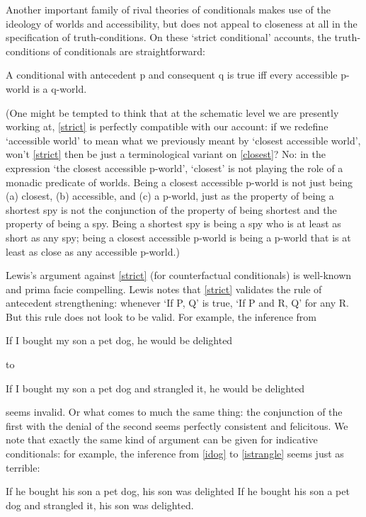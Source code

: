 \documentclass[leqno, 11pt, a5paper, openany]{article}
\begin{document}
Another important family of rival theories of conditionals makes use of the ideology of worlds and accessibility, but does not appeal to closeness at all in the specification of truth-conditions. On these ‘strict conditional’ accounts, the truth-conditions of conditionals are straightforward:
\begin{prop}
\litem[STRICT] \label{strict}
	A conditional with antecedent p and consequent q is true iff every accessible p-world is a q-world.
\end{prop}
(One might be tempted to think that at the schematic level we are
presently working at, \ref{strict} is perfectly compatible with our account:
if we redefine ‘accessible world’ to mean what we previously meant by
‘closest accessible world’, won't \ref{strict} then be just a terminological
variant on \ref{closest}? No: in the expression ‘the closest accessible
p-world’, ‘closest’ is not playing the role of a monadic predicate of
worlds. Being a closest accessible p-world is not just being (a)
closest, (b) accessible, and (c) a p-world, just as the property of
being a shortest spy is not the conjunction of the property of being
shortest and the property of being a spy. Being a shortest spy is being
a spy who is at least as short as any spy; being a closest accessible
p-world is being a p-world that is at least as close as any accessible
p-world.)

Lewis's argument against \ref{strict} (for counterfactual conditionals) is
well-known and prima facie compelling. Lewis notes that \ref{strict} validates
the rule of antecedent strengthening: whenever ‘If P, Q’ is true, ‘If P
and R, Q’ for any R. But this rule does not look to be valid. For example, the inference
from
\begin{prop}
	\nitem \label{dog}
	If I bought my son a pet dog, he would be delighted
\end{prop}
to
\begin{prop}
	\nitem \label{strangle}
	If I bought my son a pet dog and strangled it, he would be delighted
\end{prop}
seems invalid. Or what comes to much the same thing: the conjunction of the first with the denial of the second seems perfectly consistent and felicitous. We note that exactly the same kind of argument can be given for indicative conditionals: for example, the inference from \ref{idog} to \ref{istrangle} seems just as terrible:
\begin{prop}
	\nitem \label{idog}
	If he bought his son a pet dog, his son was delighted
	\nitem \label{istrangle}
	If he bought his son a pet dog and strangled it, his son was delighted.
\end{prop}
\end{document}
